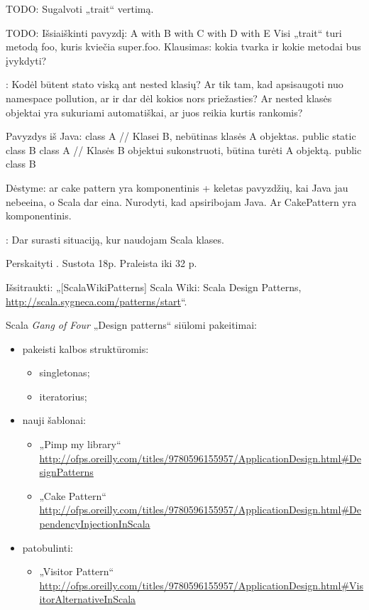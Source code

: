 TODO: Sugalvoti „trait“ vertimą.

TODO: Išsiaiškinti pavyzdį:
A with B with C with D with E
Visi „trait“ turi metodą foo, kuris kviečia super.foo. Klausimas:
kokia tvarka ir kokie metodai bus įvykdyti?

\TODO: Kodėl būtent stato viską ant nested klasių? Ar tik tam, kad
apsisaugoti nuo namespace pollution, ar ir dar dėl kokios nors
priežasties? Ar nested klasės objektai yra sukuriami automatiškai,
ar juos reikia kurtis rankomis?

Pavyzdys iš Java:
class A { // Klasei B, nebūtinas klasės A objektas.
  public static class B {
    }
}
class A { // Klasės B objektui sukonstruoti, būtina turėti A objektą.
  public class B {
  }
}

Dėstyme: ar cake pattern yra komponentinis + keletas pavyzdžių,
kai Java jau nebeeina, o Scala dar eina. Nurodyti, kad apsiribojam Java.
Ar CakePattern yra komponentinis.

\TODO: Dar surasti situaciją, kur naudojam Scala klases.

\TODO Perskaityti \cite{scala-design-patterns}. Sustota 18p. Praleista
iki 32 p.

\TODO Išsitraukti: „[ScalaWikiPatterns] Scala Wiki: Scala Design Patterns, 
\url{http://scala.sygneca.com/patterns/start}“.

Scala \emph{Gang of Four} „Design patterns“ siūlomi pakeitimai:
\begin{itemize}
  \item pakeisti kalbos struktūromis:
    \begin{itemize}
      \item singletonas;
      \item iteratorius;
    \end{itemize}
  \item nauji šablonai:
    \begin{itemize}
      \item „Pimp my library“
        \url{http://ofps.oreilly.com/titles/9780596155957/ApplicationDesign.html#DesignPatterns}
      \item „Cake Pattern“
        \url{http://ofps.oreilly.com/titles/9780596155957/ApplicationDesign.html#DependencyInjectionInScala}
    \end{itemize}
  \item patobulinti:
    \begin{itemize}
      \item „Visitor Pattern“
        \url{http://ofps.oreilly.com/titles/9780596155957/ApplicationDesign.html#VisitorAlternativeInScala}
    \end{itemize}
\end{itemize}


